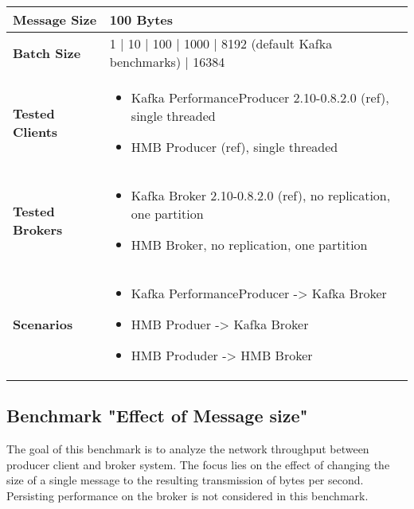 \begin{table}[H]
\begin{tabular}{|l| p{12cm}|} \hline
{\bf Message Size}   & 100 Bytes \\ \hline
{\bf Batch Size}     & 1 | 10 | 100 | 1000 | 8192 (default Kafka benchmarks) | 16384 \\ \hline
{\bf Tested Clients} &
    \begin{itemize}
        \item Kafka PerformanceProducer 2.10-0.8.2.0 (ref), single threaded
        \item HMB Producer (ref), single threaded
    \end{itemize}\\ \hline
{\bf Tested Brokers} &
    \begin{itemize}
        \item Kafka Broker 2.10-0.8.2.0 (ref), no replication, one partition
        \item HMB Broker, no replication, one partition
    \end{itemize}\\ \hline
{\bf Scenarios} &
    \begin{itemize}
        \item Kafka PerformanceProducer -> Kafka Broker
        \item HMB Produer -> Kafka Broker
        \item HMB Produder -> HMB Broker
    \end{itemize} \\ \hline
\end{tabular}
\end{table}


\subsection{Benchmark "Effect of Message size"}
The goal of this benchmark is to analyze the network throughput between
producer client and broker system. The focus lies on the effect of changing the
size of a single message to the resulting transmission of bytes per
second. Persisting performance on the broker is not considered in
this benchmark.


